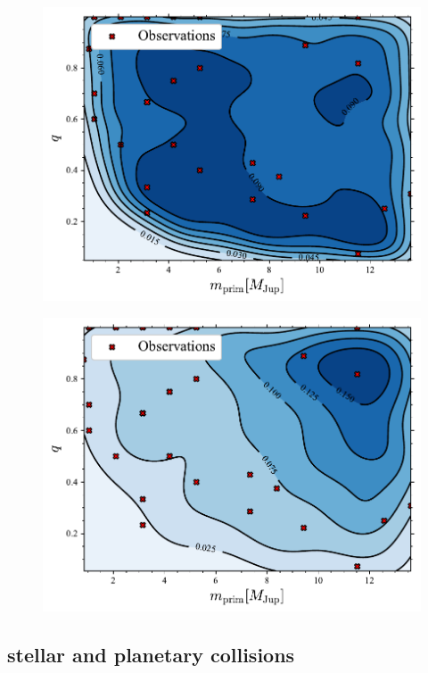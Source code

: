 \documentclass[aa]{lib/aa}
\begin{document}
\begin{figure}
    \centering
        \includegraphics[width=.91\columnwidth]{figures/mass_distr_Plummer_rvir0.5.pdf}
        \caption{}
         \label{Fig:Plummer_massfunction}
\end{figure}
\begin{figure}
    \centering
        \includegraphics[width=.91\columnwidth]{figures/mass_distr_Fractal_rvir0.5.pdf}
        \caption{}
         \label{Fig:fractal_massfunction}
\end{figure}



\subsection{stellar and planetary collisions}
\end{document}
